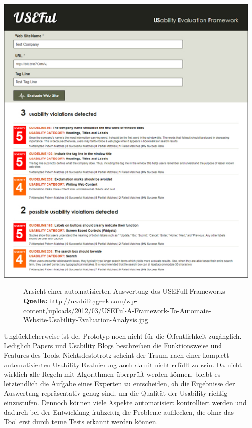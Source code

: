 \vspace{0.3cm}
\begin{center}
\includegraphics[scale=1]{./images/usefull}
\end{center}
\begin{figure}[htb]
   \centering
   \caption{Ansicht einer automatisierten Auswertung des USEFull Frameworks\\\textbf{Quelle:} http://usabilitygeek.com/wp-content/uploads/2012/03/USEFul-A-Framework-To-Automate-Website-Usability-Evaluation-Analysis.jpg}
    \label{usefull}
\end{figure}

Unglücklicherweise ist der Prototyp noch nicht für die Öffentlichkeit zugänglich. Lediglich Papers und Usability Blogs beschreiben die Funktionsweise und Features des Tools. Nichtsdestotrotz scheint der Traum nach einer komplett automatisierten Usability Evaluierung auch damit nicht erfüllt zu sein. Da nicht wirklich alle Regeln mit Algorithmen überprüft werden können, bleibt es letztendlich die Aufgabe eines Experten zu entscheiden, ob die Ergebnisse der Auswertung repräsentativ genug sind, um die Qualität der Usability richtig einzustufen. Dennoch können viele Aspekte automatisiert kontrolliert werden und dadurch bei der Entwicklung frühzeitig die Probleme aufdecken, die ohne das Tool erst durch teure Tests erkannt werden können.












